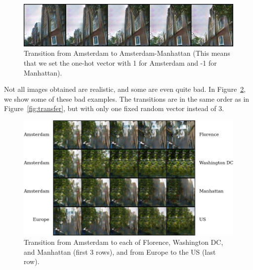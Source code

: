 \documentclass[a4paper]{article}
\begin{document}
\begin{figure}[h]
	\centering
	\includegraphics[width=0.49\linewidth]{figures/amsterdam_minus_manhattan}
	\caption{Transition from Amsterdam to Amsterdam-Manhattan (This means that we set the one-hot vector with 1 for Amsterdam and -1 for Manhattan).}
	\label{fig:minusmanhattan}
\end{figure}

Not all images obtained are realistic, and some are even quite bad.
In Figure~\ref{fig:bad}, we show some of these bad examples.
The transitions are in the same order as in Figure~\ref{fig:transfer}, but with only one fixed random vector instead of 3.

\begin{figure}[h]
	\centering
	\includegraphics[width=0.7\linewidth]{figures/bad/merged_names}
	\caption{Transition from Amsterdam to each of Florence, Washington DC, and Manhattan (first 3 rows), and from Europe to the US (last row).}
	\label{fig:bad}
\end{figure}




\end{document}
